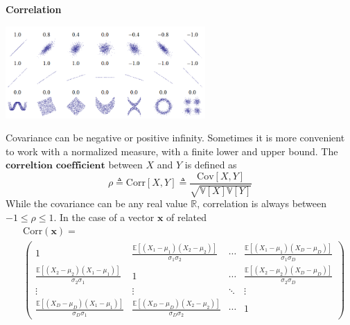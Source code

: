 \documentclass[10pt,landscape]{article}
\newcommand{\cov}{\textrm{Cov}}
\newcommand{\corr}{\textrm{Corr}}
\newcommand{\var}{\mathbb{V}}
\newcommand{\inp}{\textbf{x}}
\newcommand{\R}{\mathbb{R}}
\begin{document}
\begin{multicols*}{3}
\textbf{Correlation}

\begin{minipage}{\linewidth}
    \centering
    \includegraphics[width=3in]{figures/correlation.PNG}
\end{minipage}

Covariance can be negative or positive infinity. Sometimes it is more convenient to work with a normalized measure, with a finite lower and upper bound. The $\textbf{correltion coefficient}$ between $X$ and $Y$ is defined as
\[
    \rho\triangleq\corr[X,Y]\triangleq\frac{\cov[X,Y]}{\sqrt{\var[X]\var[Y]}}
\]
While the covariance can be any real value $\R$, correlation is always between $-1\leq\rho\leq1$. In the case of a vector $\inp$ of related 
\begin{align*}
    & \corr(\inp)= \\ 
    &\begin{pmatrix}
    1 & \!\!\!\!\!\!\! \frac{\mathbb{E}[(X_1 - \mu_1)(X_2 - \mu_2)]}{\sigma_1 \sigma_2} & \!\!\!\!\!\!\! \cdots & \!\!\!\!\!\!\! \frac{\mathbb{E}[(X_1 - \mu_1)(X_D - \mu_D)]}{\sigma_1 \sigma_D} \\
    \frac{\mathbb{E}[(X_2 - \mu_2)(X_1 - \mu_1)]}{\sigma_2 \sigma_1} & \!\!\!\!\!\!\! 1 & \!\!\!\!\!\!\!\cdots & \!\!\!\!\!\!\!\frac{\mathbb{E}[(X_2 - \mu_2)(X_D - \mu_D)]}{\sigma_2 \sigma_D} \\
    \vdots &\!\!\!\!\!\!\! \vdots &\!\!\!\!\!\!\! \ddots & \!\!\!\!\!\!\!\vdots \\ 
    \frac{\mathbb{E}[(X_D - \mu_D)(X_1 - \mu_1)]}{\sigma_D \sigma_1} &\!\!\!\!\!\!\! \frac{\mathbb{E}[(X_D - \mu_D)(X_2 - \mu_2)]}{\sigma_D \sigma_2} & \!\!\!\!\!\!\!\cdots &\!\!\!\!\!\!\! 1
    \end{pmatrix}
\end{align*}


\end{multicols*}
\end{document}
